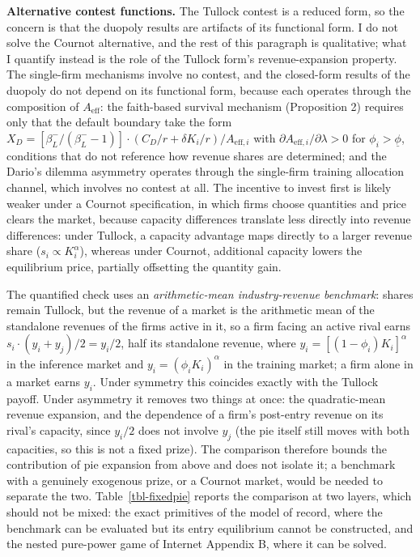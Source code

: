 \documentclass[
  11pt,
  letterpaper,
]{scrartcl}
\begin{document}
\textbf{Alternative contest functions.} The Tullock contest is a reduced
form, so the concern is that the duopoly results are artifacts of its
functional form. I do not solve the Cournot alternative, and the rest of
this paragraph is qualitative; what I quantify instead is the role of
the Tullock form's revenue-expansion property. The single-firm
mechanisms involve no contest, and the closed-form results of the
duopoly do not depend on its functional form, because each operates
through the composition of \(A_{\text{eff}}\): the faith-based survival
mechanism (Proposition 2) requires only that the default boundary take
the form
\(X_D = [\beta_L^-/(\beta_L^- - 1)] \cdot (C_D/r + \delta K_i/r) / A_{\text{eff},i}\)
with \(\partial A_{\text{eff},i}/\partial \lambda > 0\) for
\(\phi_i > \underline{\phi}\), conditions that do not reference how
revenue shares are determined; and the Dario's dilemma asymmetry
operates through the single-firm training allocation channel, which
involves no contest at all. The incentive to invest first is likely
weaker under a Cournot specification, in which firms choose quantities
and price clears the market, because capacity differences translate less
directly into revenue differences: under Tullock, a capacity advantage
maps directly to a larger revenue share (\(s_i \propto K_i^\alpha\)),
whereas under Cournot, additional capacity lowers the equilibrium price,
partially offsetting the quantity gain.

The quantified check uses an \emph{arithmetic-mean industry-revenue
benchmark}: shares remain Tullock, but the revenue of a market is the
arithmetic mean of the standalone revenues of the firms active in it, so
a firm facing an active rival earns \(s_i \cdot (y_i + y_j)/2 = y_i/2\),
half its standalone revenue, where \(y_i = [(1-\phi_i)K_i]^\alpha\) in
the inference market and \(y_i = (\phi_i K_i)^\alpha\) in the training
market; a firm alone in a market earns \(y_i\). Under symmetry this
coincides exactly with the Tullock payoff. Under asymmetry it removes
two things at once: the quadratic-mean revenue expansion, and the
dependence of a firm's post-entry revenue on its rival's capacity, since
\(y_i/2\) does not involve \(y_j\) (the pie itself still moves with both
capacities, so this is not a fixed prize). The comparison therefore
bounds the contribution of pie expansion from above and does not isolate
it; a benchmark with a genuinely exogenous prize, or a Cournot market,
would be needed to separate the two. Table~\ref{tbl-fixedpie} reports
the comparison at two layers, which should not be mixed: the exact
primitives of the model of record, where the benchmark can be evaluated
but its entry equilibrium cannot be constructed, and the nested
pure-power game of Internet Appendix B, where it can be solved.
\end{document}
